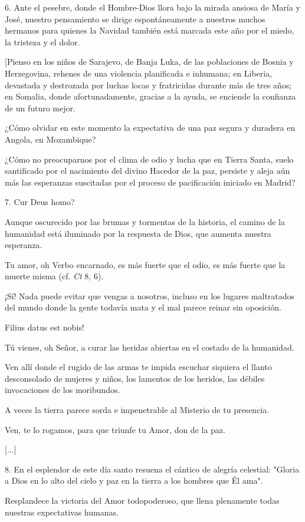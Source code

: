 \begin{body}
\begin{body}
6. Ante el pesebre, donde el Hombre-Dios llora bajo la mirada ansiosa de María y José, nuestro pensamiento se dirige espontáneamente a nuestros muchos hermanos para quienes la Navidad también está marcada este año por el miedo, la tristeza y el dolor.

{[}Pienso en los niños de Sarajevo, de Banja Luka, de las poblaciones de Bosnia y Herzegovina, rehenes de una violencia planificada e inhumana; en Liberia, devastada y destrozada por luchas locas y fratricidas durante más de tres años; en Somalia, donde afortunadamente, gracias a la ayuda, se enciende la confianza de un futuro mejor.

¿Cómo olvidar en este momento la expectativa de una paz segura y duradera en Angola, en Mozambique?

¿Cómo no preocuparnos por el clima de odio y lucha que en Tierra Santa, suelo santificado por el nacimiento del divino Hacedor de la paz, persiste y aleja aún más las esperanzas suscitadas por el proceso de pacificación iniciado en Madrid?

7. Cur Deus homo?

Aunque oscurecido por las brumas y tormentas de la historia, el camino de la humanidad está iluminado por la respuesta de Dios, que aumenta nuestra esperanza.

Tu amor, oh Verbo encarnado, es más fuerte que el odio, es más fuerte que la muerte misma (cf. \emph{Ct} 8, 6).

¡Sí! Nada puede evitar que vengas a nosotros, incluso en los lugares maltratados del mundo donde la gente todavía mata y el mal parece reinar sin oposición.

Filius datus est nobis!

Tú vienes, oh Señor, a curar las heridas abiertas en el costado de la humanidad.

Ven allí donde el rugido de las armas te impida escuchar siquiera el llanto desconsolado de mujeres y niños, los lamentos de los heridos, las débiles invocaciones de los moribundos.

A veces la tierra parece sorda e impenetrable al Misterio de tu presencia.

Ven, te lo rogamos, para que triunfe tu Amor, don de la paz.

{[}...{]}

8. En el esplendor de este día santo resuena el cántico de alegría celestial: "Gloria a Dios en lo alto del cielo y paz en la tierra a los hombres que Él ama".

Resplandece la victoria del Amor todopoderoso, que llena plenamente todas nuestras expectativas humanas.


\end{body}
\end{body}
